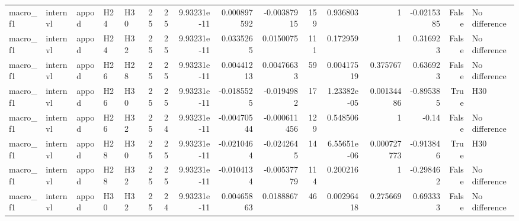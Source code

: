 \begin{longtable}{lllllrrrrrrrrrrl}
macro\_f1 & internvl & appod & H24 & H30 & 25 & 25 & 9.93231e-11 & 0.000897592 & -0.00387915 & 159 & 0.936803 & 1 & -0.0215385 & False & No difference \\
macro\_f1 & internvl & appod & H24 & H32 & 25 & 25 & 9.93231e-11 & 0.0335265 & 0.0150075 & 111 & 0.172959 & 1 & 0.316923 & False & No difference \\
macro\_f1 & internvl & appod & H26 & H28 & 25 & 25 & 9.93231e-11 & 0.00441213 & 0.00476633 & 59 & 0.00417519 & 0.375767 & 0.636923 & False & No difference \\
macro\_f1 & internvl & appod & H26 & H30 & 25 & 25 & 9.93231e-11 & -0.0185525 & -0.0194982 & 17 & 1.23382e-05 & 0.00134486 & -0.895385 & True & H30 \\
macro\_f1 & internvl & appod & H26 & H32 & 25 & 24 & 9.93231e-11 & -0.00470544 & -0.000611456 & 129 & 0.548506 & 1 & -0.14 & False & No difference \\
macro\_f1 & internvl & appod & H28 & H30 & 25 & 25 & 9.93231e-11 & -0.0210464 & -0.0242645 & 14 & 6.55651e-06 & 0.000727773 & -0.913846 & True & H30 \\
macro\_f1 & internvl & appod & H28 & H32 & 25 & 25 & 9.93231e-11 & -0.0104134 & -0.00537779 & 114 & 0.200216 & 1 & -0.298462 & False & No difference \\
macro\_f1 & internvl & appod & H30 & H32 & 25 & 24 & 9.93231e-11 & 0.00465863 & 0.0188867 & 46 & 0.00296418 & 0.275669 & 0.693333 & False & No difference \\
\end{longtable}
